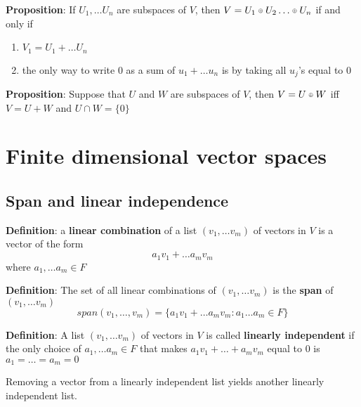 \documentclass[a4paper, 10pt]{report}
\newcommand\smallmath[2]{#1{\raisebox{\dimexpr \fontdimen 22 \textfont 2
      - \fontdimen 22 \scriptscriptfont 2 \relax}{$\scriptscriptstyle #2$}}}
\newcommand\smalloplus{\smallmath\mathbin\oplus}
\begin{document}
\begin{framed}
   \textbf{Proposition}: If $U_1, \hdots U_n$ are subspaces of $V$, then $V = U_1 \smalloplus U_2 \hdots \smalloplus U_n$ if and only if
   \begin{enumerate}
      \item $V_1 = U_1 + \hdots U_n$ 
      \item the only way to write $0$ as a sum of $u_1 + \hdots u_n$ is by taking all $u_j$'s equal to $0$
   \end{enumerate}
\end{framed}

\begin{framed}
   \textbf{Proposition}: Suppose that $U$ and $W$ are subspaces of $V$, then $V = U \smalloplus W$ iff  $V = U + W$ and $U \cap W = \{ 0 \} $
\end{framed}

\chapter{Finite dimensional vector spaces}

\section{Span and linear independence}

\begin{framed}
  \textbf{Definition}: a \textbf{linear combination} of a list $(v_1, \hdots v_m)$ of vectors in $V$ is a vector of the form
  \[
     a_1 v_1 + \hdots a_m v_m
  \] 
   where $a_1, \hdots a_m \in F$
\end{framed}

\begin{framed}
   \textbf{Definition}: The set of all linear combinations of $(v_1, \hdots v_m)$ is the \textbf{span} of $(v_1, \hdots v_m)$ 
   \[
     span(v_1, \hdots, v_m) = \{ a_1v_1 + \hdots a_m v_m: a_1 \hdots a_m \in F \} 
   \] 
\end{framed}

\begin{framed}
   \textbf{Definition}: A list $(v_1, \hdots v_m)$ of vectors in $V$ is called \textbf{linearly independent} if the only choice of $a_1, \hdots a_m \in F$ that makes $a_1v_1 + \hdots + a_m v_m$ equal to $0$ is $a_1 = \hdots = a_m = 0$
\end{framed}

Removing a vector from a linearly independent list yields another linearly independent list. 
\end{document}
